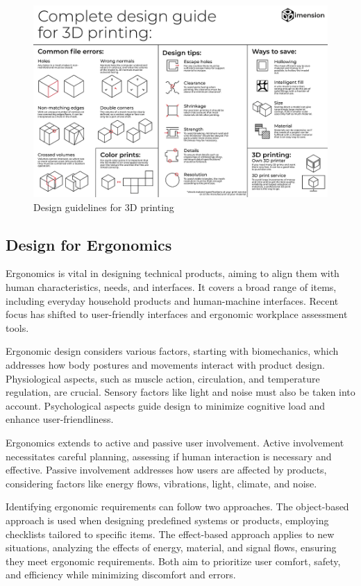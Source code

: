 \begin{figure}
    \centering
    \includegraphics[width=0.92\linewidth]{texs/Part1/chapter4/image/guidelines.png}
    \caption{Design guidelines for 3D printing \cite{DDDimension_22}}
    \label{fig:guideline}
\end{figure}

\subsection{Design for Ergonomics}
Ergonomics \cite{Pahl07ab} is vital in designing technical products, aiming to align them with human characteristics, needs, and interfaces. It covers a broad range of items, including everyday household products and human-machine interfaces. Recent focus has shifted to user-friendly interfaces and ergonomic workplace assessment tools.

Ergonomic design considers various factors, starting with biomechanics, which addresses how body postures and movements interact with product design. Physiological aspects, such as muscle action, circulation, and temperature regulation, are crucial. Sensory factors like light and noise must also be taken into account. Psychological aspects guide design to minimize cognitive load and enhance user-friendliness.

Ergonomics extends to active and passive user involvement. Active involvement necessitates careful planning, assessing if human interaction is necessary and effective. Passive involvement addresses how users are affected by products, considering factors like energy flows, vibrations, light, climate, and noise.

Identifying ergonomic requirements can follow two approaches. The object-based approach is used when designing predefined systems or products, employing checklists tailored to specific items. The effect-based approach applies to new situations, analyzing the effects of energy, material, and signal flows, ensuring they meet ergonomic requirements. Both aim to prioritize user comfort, safety, and efficiency while minimizing discomfort and errors.




